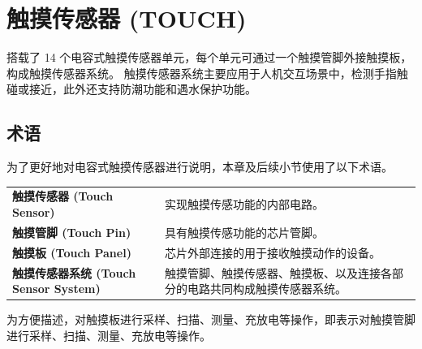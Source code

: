 \documentclass[main\_\_CN.tex]{subfiles}
\begin{document}

\ifglobal
\else
    {\let\clearpage\relax \listoftodos}
    {\let\clearpage\relax \listofdonetodos}
    \tableofcontents
\fi



\hypertarget{tchsen}{}
\chapter{触摸传感器 (TOUCH)}
\label{mod:tchsen}

\chipname{} 搭载了 14 个电容式触摸传感器单元，每个单元可通过一个触摸管脚外接触摸板，构成触摸传感器系统。\chipname{} 触摸传感器系统主要应用于人机交互场景中，检测手指触碰或接近，此外还支持防潮功能和遇水保护功能。

\section{术语}
\label{sec:tchsen-term}

为了更好地对电容式触摸传感器进行说明，本章及后续小节使用了以下术语。 

\begin{longtable}[c]{ R{7cm} p{9cm} }
\textbf{触摸传感器 (Touch Sensor)}  & 实现触摸传感功能的内部电路。 \\
\textbf{触摸管脚 (Touch Pin)}    & 具有触摸传感功能的芯片管脚。 \\
\textbf{触摸板 (Touch Panel)}  & 芯片外部连接的用于接收触摸动作的设备。\\
\textbf{触摸传感器系统 (Touch Sensor System)}  & 触摸管脚、触摸传感器、触摸板、以及连接各部分的电路共同构成触摸传感器系统。 \\
\end{longtable}

\vspace{-1em}
\begin{tiplisting}
为方便描述，对触摸板进行采样、扫描、测量、充放电等操作，即表示对触摸管脚进行采样、扫描、测量、充放电等操作。
\end{tiplisting}
\vspace{-2em}


\end{document}
